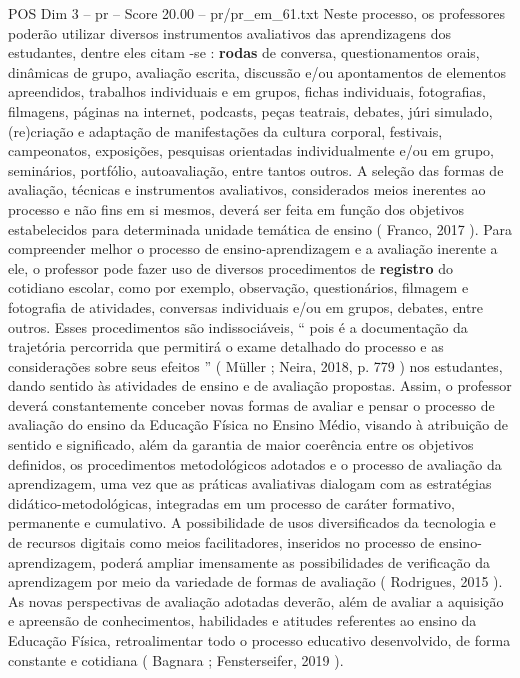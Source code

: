 \begin{textsample}{POS Dim 3 – pr – Score 20.00 – pr/pr\_em\_61.txt}
Neste processo, os professores poderão utilizar diversos instrumentos avaliativos das aprendizagens dos estudantes, dentre eles citam -se : \textbf{rodas} de conversa, questionamentos orais, dinâmicas de grupo, avaliação escrita, discussão e/ou apontamentos de elementos apreendidos, trabalhos individuais e em grupos, fichas individuais, fotografias, filmagens, páginas na internet, podcasts, peças teatrais, debates, júri simulado, (re)criação e adaptação de manifestações da cultura corporal, festivais, campeonatos, exposições, pesquisas orientadas individualmente e/ou em grupo, seminários, portfólio, autoavaliação, entre tantos outros.
A seleção das formas de avaliação, técnicas e instrumentos avaliativos, considerados meios inerentes ao processo e não fins em si mesmos, deverá ser feita em função dos objetivos estabelecidos para determinada unidade temática de ensino ( Franco, 2017 ).
Para compreender melhor o processo de ensino-aprendizagem e a avaliação inerente a ele, o professor pode fazer uso de diversos procedimentos de \textbf{registro} do cotidiano escolar, como por exemplo, observação, questionários, filmagem e fotografia de atividades, conversas individuais e/ou em grupos, debates, entre outros.
Esses procedimentos são indissociáveis, “ pois é a documentação da trajetória percorrida que permitirá o exame detalhado do processo e as considerações sobre seus efeitos ” ( Müller ; Neira, 2018, p. 779 ) nos estudantes, dando sentido às atividades de ensino e de avaliação propostas.
Assim, o professor deverá constantemente conceber novas formas de avaliar e pensar o processo de avaliação do ensino da Educação Física no Ensino Médio, visando à atribuição de sentido e significado, além da garantia de maior coerência entre os objetivos definidos, os procedimentos metodológicos adotados e o processo de avaliação da aprendizagem, uma vez que as práticas avaliativas dialogam com as estratégias didático-metodológicas, integradas em um processo de caráter formativo, permanente e cumulativo.
A possibilidade de usos diversificados da tecnologia e de recursos digitais como meios facilitadores, inseridos no processo de ensino-aprendizagem, poderá ampliar imensamente as possibilidades de verificação da aprendizagem por meio da variedade de formas de avaliação ( Rodrigues, 2015 ).
As novas perspectivas de avaliação adotadas deverão, além de avaliar a aquisição e apreensão de conhecimentos, habilidades e atitudes referentes ao ensino da Educação Física, retroalimentar todo o processo educativo desenvolvido, de forma constante e cotidiana ( Bagnara ; Fensterseifer, 2019 ).

\end{textsample}
